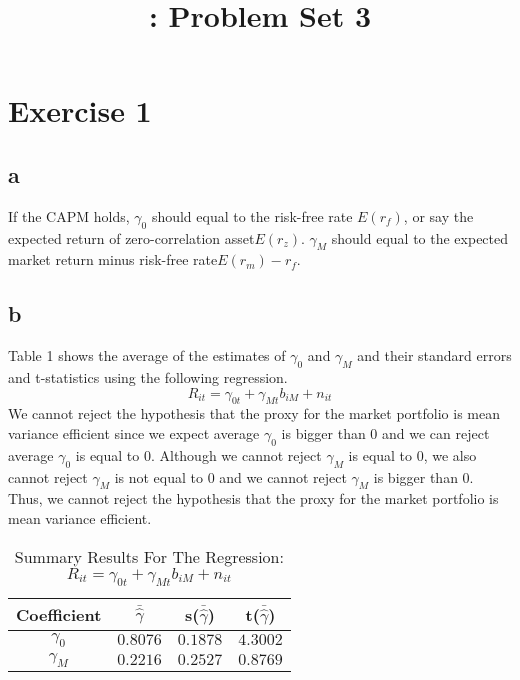 \documentclass{report}
\title{\LectureTitle: Problem Set 3}
\begin{document}
\maketitle
\newpage

\section{Exercise 1}

\subsection{a}
If the CAPM holds, $\gamma_{0}$ should equal to the risk-free rate $E(r_{f})$, or say the expected return of zero-correlation asset$E(r_{z})$. $\gamma_{M}$ should equal to the expected market return minus risk-free rate$E(r_{m}) - r_{f}$.

\subsection{b}
Table 1 shows the average of the estimates of $\gamma_{0}$ and $\gamma_{M}$ and their standard errors and t-statistics using the following regression.
\[  R_{it} = \gamma_{0t} + \gamma_{Mt}b_{iM} +n_{it} \]
We cannot reject the hypothesis that the proxy for the market portfolio is mean variance efficient since we expect average $\gamma_{0}$ is bigger than 0 and we can reject average $\gamma_{0}$ is equal to 0. Although we cannot reject $\gamma_{M}$ is equal to 0, we also cannot reject  $\gamma_{M}$ is not equal to 0 and we cannot reject $\gamma_{M}$ is bigger than 0. Thus, we cannot reject the hypothesis that the proxy for the market portfolio is mean variance efficient.
\begin{table}[H]
\centering
\begin{tabular}{|c|c|c|c|}
\hline
Coefficient& $\bar{\hat{\gamma}}$ & s($\bar{\hat{\gamma}}$) & t($\bar{\hat{\gamma}}$) \\
\hline
$\gamma_{0}$ & $0.8076$ & $0.1878$ & $4.3002$\\
\hline
$\gamma_{M}$ & $0.2216$ & $0.2527$ & $0.8769$\\
\hline
\end{tabular}
\caption{ Summary Results For The Regression: $ R_{it} = \gamma_{0t} + \gamma_{Mt}b_{iM} +n_{it} $}
\end{table}
\end{document}
